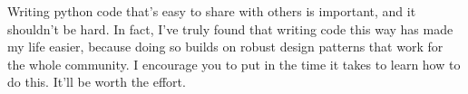 \documentclass{article}
\begin{document}
Writing python code that's easy to share with others is important, and it 
shouldn't be hard.  In fact, I've truly found that writing code this way has 
made my life easier, because doing so builds on robust design patterns that 
work for the whole community.  I encourage you to put in the time it takes to 
learn how to do this.  It'll be worth the effort.
\end{document}
